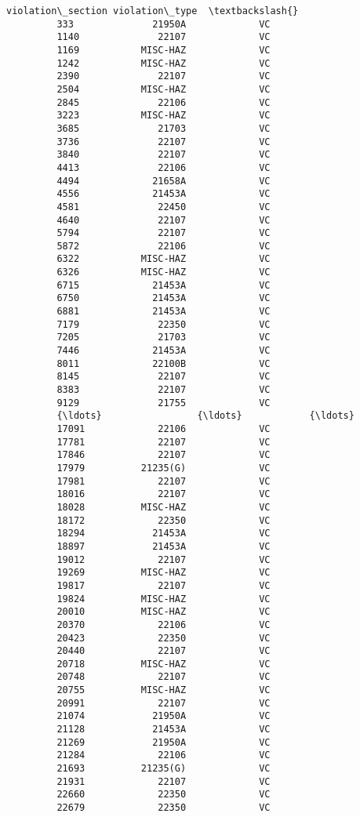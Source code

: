 \documentclass[11pt]{article}
\begin{document}
\begin{Verbatim}[commandchars=\\\{\}]
               violation\_section violation\_type  \textbackslash{}
         333              21950A             VC   
         1140              22107             VC   
         1169           MISC-HAZ             VC   
         1242           MISC-HAZ             VC   
         2390              22107             VC   
         2504           MISC-HAZ             VC   
         2845              22106             VC   
         3223           MISC-HAZ             VC   
         3685              21703             VC   
         3736              22107             VC   
         3840              22107             VC   
         4413              22106             VC   
         4494             21658A             VC   
         4556             21453A             VC   
         4581              22450             VC   
         4640              22107             VC   
         5794              22107             VC   
         5872              22106             VC   
         6322           MISC-HAZ             VC   
         6326           MISC-HAZ             VC   
         6715             21453A             VC   
         6750             21453A             VC   
         6881             21453A             VC   
         7179              22350             VC   
         7205              21703             VC   
         7446             21453A             VC   
         8011             22100B             VC   
         8145              22107             VC   
         8383              22107             VC   
         9129              21755             VC   
         {\ldots}                 {\ldots}            {\ldots}   
         17091             22106             VC   
         17781             22107             VC   
         17846             22107             VC   
         17979          21235(G)             VC   
         17981             22107             VC   
         18016             22107             VC   
         18028          MISC-HAZ             VC   
         18172             22350             VC   
         18294            21453A             VC   
         18897            21453A             VC   
         19012             22107             VC   
         19269          MISC-HAZ             VC   
         19817             22107             VC   
         19824          MISC-HAZ             VC   
         20010          MISC-HAZ             VC   
         20370             22106             VC   
         20423             22350             VC   
         20440             22107             VC   
         20718          MISC-HAZ             VC   
         20748             22107             VC   
         20755          MISC-HAZ             VC   
         20991             22107             VC   
         21074            21950A             VC   
         21128            21453A             VC   
         21269            21950A             VC   
         21284             22106             VC   
         21693          21235(G)             VC   
         21931             22107             VC   
         22660             22350             VC   
         22679             22350             VC   
         

\end{Verbatim}
\end{document}
